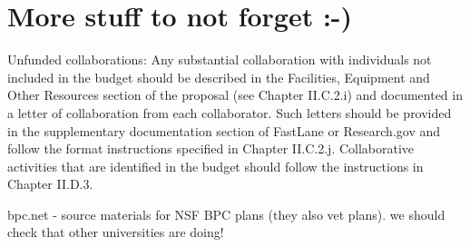 \iflater
\section*{More stuff to not forget :-)}

Unfunded collaborations: Any substantial collaboration with
individuals not included in the budget should be described in the
Facilities, Equipment and Other Resources section of the proposal (see
Chapter II.C.2.i) and documented in a letter of collaboration from
each collaborator. Such letters should be provided in the
supplementary documentation section of FastLane or Research.gov and
follow the format instructions specified in Chapter
II.C.2.j. Collaborative activities that are identified in the budget
should follow the instructions in Chapter II.D.3.  

bpc.net - source materials for NSF BPC plans (they also vet plans).
  we should check that other universities are doing!

\fi
